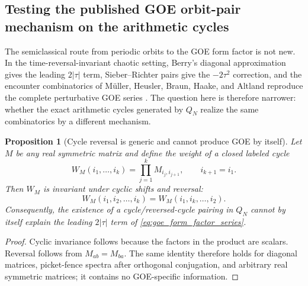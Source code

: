 \documentclass[11pt]{amsart}
\numberwithin{equation}{section}
\theoremstyle{plain}
\newtheorem{proposition}[theorem]{Proposition}
\theoremstyle{definition}
\theoremstyle{remark}
\begin{document}
\subsection{Testing the published GOE orbit-pair mechanism on the arithmetic cycles}
\label{subsec:test_goe_orbit_pair}

The semiclassical route from periodic orbits to the GOE form factor is not new.  In the time-reversal-invariant chaotic setting, Berry's diagonal approximation gives the leading $2|\tau|$ term, Sieber--Richter pairs give the $-2\tau^2$ correction, and the encounter combinatorics of M\"uller, Heusler, Braun, Haake, and Altland reproduce the complete perturbative GOE series \cite{Berry1985,SieberRichter2001,MullerEtAl2004,MullerEtAl2005}.  The question here is therefore narrower: whether the exact arithmetic cycles generated by $Q_N$ realize the same combinatorics by a different mechanism.

\begin{proposition}[Cycle reversal is generic and cannot produce GOE by itself]
\label{prop:cycle_reversal_generic}
Let $M$ be any real symmetric matrix and define the weight of a closed labeled cycle
\begin{equation}
W_M(i_1,\ldots,i_k)
=\prod_{j=1}^{k}M_{i_j,i_{j+1}},
\qquad i_{k+1}=i_1.
\label{eq:cycle_weight_general}
\end{equation}
Then $W_M$ is invariant under cyclic shifts and reversal:
\begin{equation}
W_M(i_1,i_2,\ldots,i_k)
=W_M(i_1,i_k,\ldots,i_2).
\label{eq:cycle_reversal_identity}
\end{equation}
Consequently, the existence of a cycle/reversed-cycle pairing in $Q_N$ cannot by itself explain the leading $2|\tau|$ term of \eqref{eq:goe_form_factor_series}.
\end{proposition}

\begin{proof}
Cyclic invariance follows because the factors in the product are scalars.  Reversal follows from $M_{ab}=M_{ba}$.  The same identity therefore holds for diagonal matrices, picket-fence spectra after orthogonal conjugation, and arbitrary real symmetric matrices; it contains no GOE-specific information.
\end{proof}
\end{document}
